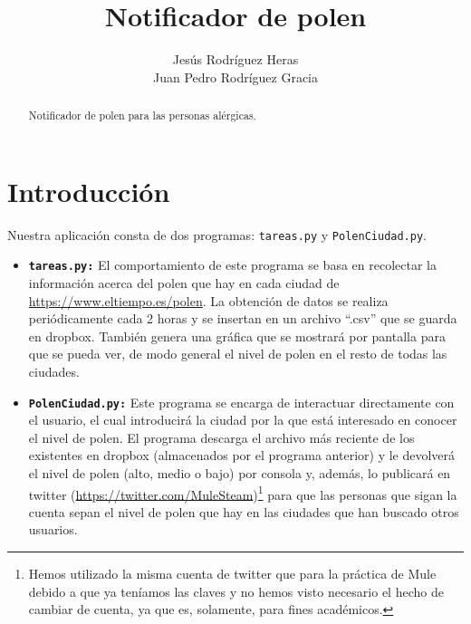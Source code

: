 \documentclass[12pt,letterpaper]{article}
\title{Notificador de polen}
\author{Jesús Rodríguez Heras\\Juan Pedro Rodríguez Gracia}
\begin{document}
	
	\maketitle
	\begin{abstract} %
		\begin{center}
			Notificador de polen para las personas alérgicas.
		\end{center}
	\end{abstract}
	\thispagestyle{empty}
	\newpage
	
	\tableofcontents
	\newpage
	
	
	
	
	\lstset{language=bash, numbers=left, numberstyle=\tiny, numbersep=10pt, firstnumber=1, stepnumber=1, basicstyle=\small\ttfamily, tabsize=1, extendedchars=true, inputencoding=latin1}


\section{Introducción}
Nuestra aplicación consta de dos programas: \texttt{tareas.py} y \texttt{PolenCiudad.py}.
\begin{itemize}
	\item \texttt{\textbf{tareas.py:}} El comportamiento de este programa se basa en recolectar la información acerca del polen que hay en cada ciudad de \url{https://www.eltiempo.es/polen}. La obtención de datos se realiza periódicamente cada 2 horas y se insertan en un archivo ``.csv'' que se guarda en dropbox.  También genera una gráfica que se mostrará por pantalla para que se pueda ver, de modo general el nivel de polen en el resto de todas las ciudades.
	\item \texttt{\textbf{PolenCiudad.py:}} Este programa se encarga de interactuar directamente con el usuario, el cual introducirá la ciudad por la que está interesado en conocer el nivel de polen. El programa descarga el archivo más reciente de los existentes en dropbox (almacenados por el programa anterior) y le devolverá el nivel de polen (alto, medio o bajo) por consola y, además, lo publicará en twitter (\url{https://twitter.com/MuleSteam})\footnote{Hemos utilizado la misma cuenta de twitter que para la práctica de Mule debido a que ya teníamos las claves y no hemos visto necesario el hecho de cambiar de cuenta, ya que es, solamente, para fines académicos.} para que las personas que sigan la cuenta sepan el nivel de polen que hay en las ciudades que han buscado otros usuarios.
\end{itemize}
\end{document}
